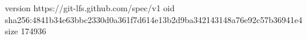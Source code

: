 version https://git-lfs.github.com/spec/v1
oid sha256:4841b34e63bbc2330d0a361f7d614e13b2d9ba342143148a76e92c57b36941e4
size 174936

